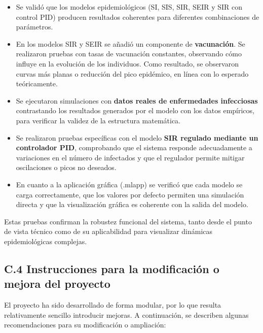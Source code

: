 \begin{itemize}
    \item Se validó que los modelos epidemiológicos (SI, SIS, SIR, SEIR y SIR con control PID) producen resultados coherentes para diferentes combinaciones de parámetros.

    \item En los modelos SIR y SEIR se añadió un componente de \textbf{vacunación}. Se realizaron pruebas con tasas de vacunación constantes, observando cómo influye en la evolución de los individuos. Como resultado, se observaron curvas más planas o reducción del pico epidémico, en línea con lo esperado teóricamente.

    \item Se ejecutaron simulaciones con \textbf{datos reales de enfermedades infecciosas} contrastando los resultados generados por el modelo con los datos empíricos, para verificar la validez de la estructura matemática.

    \item Se realizaron pruebas específicas con el modelo \textbf{SIR regulado mediante un controlador PID}, comprobando que el sistema responde adecuadamente a variaciones en el número de infectados y que el regulador permite mitigar oscilaciones o picos no deseados.

    \item En cuanto a la aplicación gráfica (.mlapp) se verificó que cada modelo se carga correctamente, que los valores por defecto permiten una simulación directa y que la visualización gráfica es coherente con la salida del modelo.

    
\end{itemize}

Estas pruebas confirman la robustez funcional del sistema, tanto desde el punto de vista técnico como de su aplicabilidad para visualizar dinámicas epidemiológicas complejas.

\subsection{C.4 Instrucciones para la modificación o mejora del proyecto}

El proyecto ha sido desarrollado de forma modular, por lo que resulta relativamente sencillo introducir mejoras. A continuación, se describen algunas recomendaciones para su modificación o ampliación:


